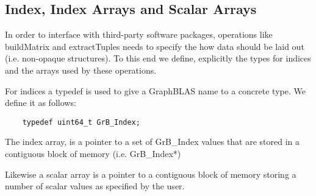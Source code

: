 \subsection{Index, Index Arrays and Scalar Arrays}

In order to interface with third-party software packages, operations like buildMatrix and extractTuples needs to specify the how data should be laid out (i.e. non-opaque structures).  To this end we define, explicitly the types for indices and the arrays used by these operations.

For indices a typedef is used to give a GraphBLAS name to a concrete type. We define it as follows:

\begin{verbatim}
    typedef uint64_t GrB_Index;
\end {verbatim}

The index array, is a pointer to a set of GrB\_Index values that are stored in a contiguous block of memory (i.e. {\sf GrB\_Index*})

Likewise a scalar array is a pointer to a contiguous block of memory storing a number of scalar values as specified by the user.
